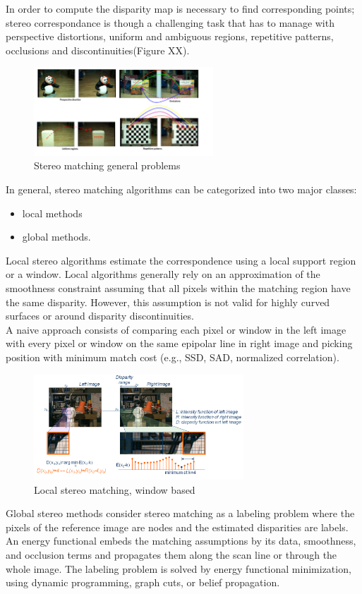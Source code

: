 In order to compute the disparity map is necessary to find corresponding points; stereo correspondance is though a challenging task that has to manage with perspective distortions, uniform and ambiguous regions, repetitive patterns, occlusions and discontinuities(Figure XX).\\
\begin{figure}[h!]
\centering
\includegraphics[width=0.6\textwidth]{./img/occl.png}
\caption{\small{Stereo matching general problems}}
\label{fig:occl}
\end{figure}
In general, stereo matching algorithms can be categorized into two major classes:
\begin{itemize}
\item local methods
\item global methods.
\end{itemize}
Local stereo algorithms estimate the correspondence using a local support region or a window. Local algorithms generally rely on an approximation of the smoothness constraint assuming that all pixels within the matching region have the same disparity. However, this assumption is not valid for highly curved surfaces or around disparity discontinuities.\\
A naive approach consists of comparing each  pixel or window in the left image with every pixel or window on the same epipolar line in right image and picking position with minimum match cost (e.g., SSD, SAD, normalized correlation).\\ 
\begin{figure}[h!]
\centering
\includegraphics[width=0.7\textwidth]{./img/local.png}
\caption{\small{Local stereo matching, window based}}
\label{fig:local}
\end{figure}
Global stereo methods consider stereo matching as a labeling problem where the pixels of the reference image are nodes and the estimated disparities are labels. An energy functional embeds the matching assumptions by its data, smoothness, and occlusion terms and propagates them along the scan line or through the whole image. The labeling problem is solved by energy functional minimization, using dynamic programming, graph cuts, or belief propagation.







